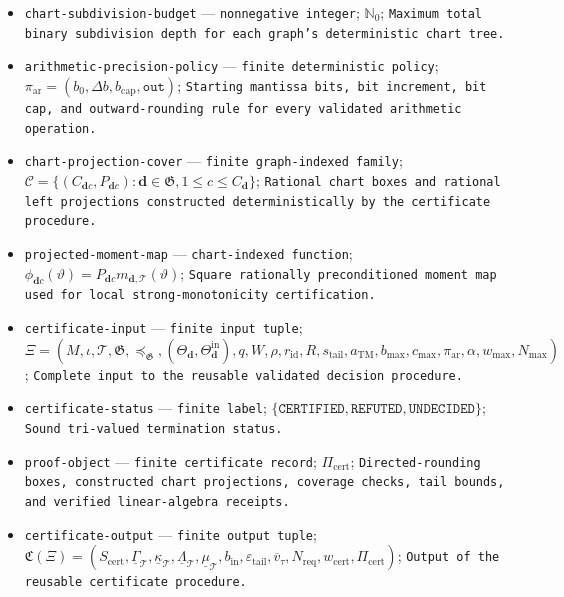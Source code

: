 \documentclass{article}
\begin{document}
\begin{itemize}
  \item \texttt{chart-\allowbreak{}subdivision-\allowbreak{}budget} --- \texttt{nonnegative integer}; \(\mathbb N_0\); \texttt{Maximum total binary subdivision depth for each graph's deterministic chart tree.}
  \item \texttt{arithmetic-\allowbreak{}precision-\allowbreak{}policy} --- \texttt{finite deterministic policy}; \(\pi_{\mathrm{ar}}=(b_0,\Delta b,b_{\mathrm{cap}},\mathtt{out})\); \texttt{Starting mantissa bits,\allowbreak{} bit increment,\allowbreak{} bit cap,\allowbreak{} and outward-\allowbreak{}rounding rule for every validated arithmetic operation.}
  \item \texttt{chart-\allowbreak{}projection-\allowbreak{}cover} --- \texttt{finite graph-\allowbreak{}indexed family}; \(\mathscr C=\{(C_{\boldsymbol d c},P_{\boldsymbol d c}):\boldsymbol d\in\mathfrak G,1\leq c\leq C_{\boldsymbol d}\}\); \texttt{Rational chart boxes and rational left projections constructed deterministically by the certificate procedure.}
  \item \texttt{projected-\allowbreak{}moment-\allowbreak{}map} --- \texttt{chart-\allowbreak{}indexed function}; \(\phi_{\boldsymbol d c}(\vartheta)=P_{\boldsymbol d c}m_{\boldsymbol d,\mathcal T}(\vartheta)\); \texttt{Square rationally preconditioned moment map used for local strong-\allowbreak{}monotonicity certification.}
  \item \texttt{certificate-\allowbreak{}input} --- \texttt{finite input tuple}; \(\Xi=(M,\iota,\mathcal T,\mathfrak G,\preceq_{\mathfrak G},(\Theta_{\boldsymbol d},\Theta^{\mathrm{in}}_{\boldsymbol d}),q,W,\rho,r_{\mathrm{id}},R,s_{\mathrm{tail}},a_{\mathrm{TM}},b_{\max},c_{\max},\pi_{\mathrm{ar}},\alpha,w_{\max},N_{\max})\); \texttt{Complete input to the reusable validated decision procedure.}
  \item \texttt{certificate-\allowbreak{}status} --- \texttt{finite label}; \(\{\mathtt{CERTIFIED},\mathtt{REFUTED},\mathtt{UNDECIDED}\}\); \texttt{Sound tri-\allowbreak{}valued termination status.}
  \item \texttt{proof-\allowbreak{}object} --- \texttt{finite certificate record}; \(\Pi_{\mathrm{cert}}\); \texttt{Directed-\allowbreak{}rounding boxes,\allowbreak{} constructed chart projections,\allowbreak{} coverage checks,\allowbreak{} tail bounds,\allowbreak{} and verified linear-\allowbreak{}algebra receipts.}
  \item \texttt{certificate-\allowbreak{}output} --- \texttt{finite output tuple}; \(\mathfrak C(\Xi)=(S_{\mathrm{cert}},\underline\Gamma_{\mathcal T},\underline\kappa_{\mathcal T},\underline\Lambda_{\mathcal T},\underline\mu_{\mathcal T},b_{\mathrm{in}},\varepsilon_{\mathrm{tail}},\overline v_\tau,N_{\mathrm{req}},w_{\mathrm{cert}},\Pi_{\mathrm{cert}})\); \texttt{Output of the reusable certificate procedure.}

\end{itemize}
\end{document}

